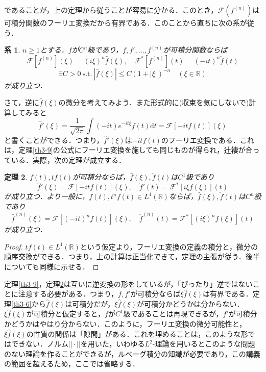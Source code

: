 \documentclass[a4j]{jsbook}
\newtheorem{theorem}{定理}
\newtheorem{cor}[theorem]{系}
\numberwithin{theorem}{chapter}  %
\begin{document}
であることが，上の定理から従うことが容易に分かる．このとき，\(\mathcal{F}\left(f^{(n)}\right)\)は可積分関数のフーリエ変換だから有界である．このことから直ちに次の系が従う．
\begin{cor}
\label{cor3-10}
\(n\geq 1\)とする．\(f\)が\(C^n\)級であり，\(f, f', \dots, f^{(n)}\)が可積分関数ならば
\begin{equation*}
    \mathcal{F}\left[f^{(n)}\right](\xi)=(i\xi)^n\hat{f}(\xi),\quad\mathcal{F}^*\left[f^{(n)}\right](t)=(-it)^n\check{f}(t)
\end{equation*}
\begin{equation*}
    \exists C>0\ \mathrm{s.t.}\ \left|\hat{f}(\xi)\right|\leq C\left(1+|\xi|\right)^{-n}\quad(\xi\in\mathbb{R})
\end{equation*}
が成り立つ．
\end{cor}
さて，逆に\(\hat{f}(\xi)\)の微分を考えてみよう．また形式的に(収束を気にしないで)計算してみると
\begin{equation*}
    \hat{f}'(\xi)=\frac{1}{\sqrt{2\pi}}\int (-it)e^{-it\xi}f(t)\mathrm{d}t=\mathcal{F}[-itf(t)](\xi)
\end{equation*}
と書くことができる．つまり，\(\hat{f}'(\xi)\)は\(-itf(t)\)のフーリエ変換である．これは，定理\ref{th3-9}の公式にフーリエ変換を施しても同じものが得られ，辻褄が合っている．実際，次の定理が成立する．
\begin{theorem}
\label{th3-11}
\(f(t), tf(t)\)が可積分ならば，\(\hat{f}(\xi), \check{f}(t)\)は\(C^1\)級であり
\begin{equation*}
    \hat{f}'(\xi)=\mathcal{F}[-itf(t)](\xi),\quad\check{f}'(t)=\mathcal{F}^*[i\xi f(\xi)](t)
\end{equation*}
が成り立つ．より一般に，\(f(t), t^nf(t)\in L^1(\mathbb{R})\)ならば，\(\hat{f}(\xi), \check{f}(t)\)は\(C^n\)級であり
\begin{equation*}
    \hat{f}^{(n)}(\xi)=\mathcal{F}[(-it)^n f(t)](\xi),\quad\check{f}^{(n)}(t)=\mathcal{F}^*[(i\xi)^n f(\xi)](t)
\end{equation*}
が成り立つ．
\end{theorem}
\begin{proof}
\(tf(t)\in L^1(\mathbb{R})\)という仮定より，フーリエ変換の定義の積分と，微分の順序交換ができる．つまり，上の計算は正当化できて，定理の主張が従う．後半についても同様に示せる．
\end{proof}
定理\ref{th3-9}，定理\ref{th3-11}は互いに逆変換の形をしているが，「ぴったり」逆ではないことに注意する必要がある．つまり，\(f, f'\)が可積分ならば\(\xi\hat{f}(\xi)\)は有界である．定理\ref{th3-6}から\(\hat{f}(\xi)\)は可積分だが，\(\xi\hat{f}(\xi)\)が可積分かどうかは分からない．\(\xi\hat{f}(\xi)\)が可積分と仮定すると，\(f\)が\(C^1\)級であることは再現できるが，\(f'\)が可積分かどうかはやはり分からない．このように，フーリエ変換の微分可能性と，\(\xi\hat{f}(\xi)\)の性質の関係は「隙間」がある．これを埋めることは，このような形ではできない．ノルム\(||\cdot||\)を用いた，いわゆる\(L^2\)-理論を用いるとこのような問題のない理論を作ることができるが，ルベーグ積分の知識が必要であり，この講義の範囲を超えるため，ここでは省略する．
\end{document}
